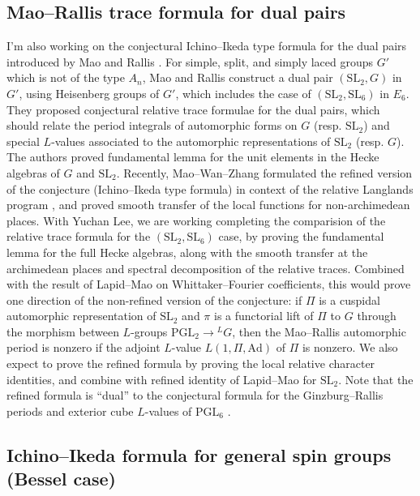 \documentclass[12pt]{article}
\begin{document}
\subsection*{Mao--Rallis trace formula for dual pairs}

I'm also working on the conjectural Ichino--Ikeda type formula for the dual pairs introduced by Mao and Rallis \cite{mao1997trace}.
For simple, split, and simply laced groups $G'$ which is not of the type $A_n$, Mao and Rallis construct a dual pair $(\mathrm{SL}_{2}, G)$ in $G'$, using Heisenberg groups of $G'$, which includes the case of $(\mathrm{SL}_{2}, \mathrm{SL}_{6})$ in $E_6$.
They proposed conjectural relative trace formulae for the dual pairs, which should relate the period integrals of automorphic forms on $G$ (resp. $\mathrm{SL}_{2}$) and special $L$-values associated to the automorphic representations of $\mathrm{SL}_{2}$ (resp. $G$).
The authors proved fundamental lemma for the unit elements in the Hecke algebras of $G$ and $\mathrm{SL}_{2}$.
Recently, Mao--Wan--Zhang \cite{mao2023bzsv} formulated the refined version of the conjecture (Ichino--Ikeda type formula) in context of the relative Langlands program \cite{ben2023relative}, and proved smooth transfer of the local functions for non-archimedean places.
With Yuchan Lee, we are working completing the comparision of the relative trace formula for the $(\mathrm{SL}_{2}, \mathrm{SL}_{6})$ case, by proving the fundamental lemma for the full Hecke algebras, along with the smooth transfer at the archimedean places and spectral decomposition of the relative traces.
Combined with the result of Lapid--Mao \cite{lapid2015conjecture} on Whittaker--Fourier coefficients, this would prove one direction of the non-refined version of the conjecture: if $\Pi$ is a cuspidal automorphic representation of $\mathrm{SL}_{2}$ and $\pi$ is a functorial lift of $\Pi$ to $G$ through the morphism between $L$-groups $\mathrm{PGL}_{2} \to {}^L G$, then the Mao--Rallis automorphic period is nonzero if the adjoint $L$-value $L(1, \Pi, \mathrm{Ad})$ of $\Pi$ is nonzero.
We also expect to prove the refined formula by proving the local relative character identities, and combine with refined identity of Lapid--Mao for $\mathrm{SL}_{2}$.
Note that the refined formula is ``dual'' to the conjectural formula for the Ginzburg--Rallis periods and exterior cube $L$-values of $\mathrm{PGL}_{6}$ \cite{ginzburg2000exterior}.


\subsection*{Ichino--Ikeda formula for general spin groups (Bessel case)}
\end{document}
